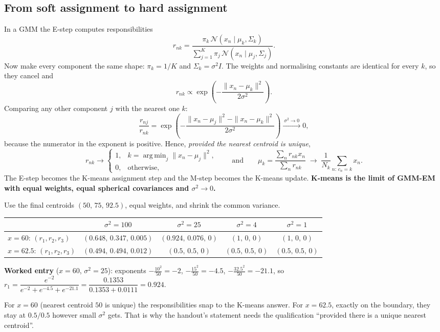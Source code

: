 \documentclass[11pt,a4paper]{article}
\newcommand{\N}{\mathcal{N}}
\DeclareMathOperator*{\argmin}{arg\,min}
\begin{document}
\subsection{From soft assignment to hard assignment}

In a GMM the E-step computes responsibilities
\[
r_{nk}=\frac{\pi_k\,\N(x_n\mid\mu_k,\Sigma_k)}{\sum_{j=1}^K\pi_j\,\N(x_n\mid\mu_j,\Sigma_j)}.
\]
Now make every component the same shape: $\pi_k=1/K$ and $\Sigma_k=\sigma^2I$. The weights and normalising constants are identical for every $k$, so they cancel and
\[
r_{nk}\propto\exp\!\left(-\frac{\|x_n-\mu_k\|^2}{2\sigma^2}\right).
\]
Comparing any other component $j$ with the nearest one $k$:
\[
\frac{r_{nj}}{r_{nk}}=\exp\!\left(-\frac{\|x_n-\mu_j\|^2-\|x_n-\mu_k\|^2}{2\sigma^2}\right)\xrightarrow{\ \sigma^2\to0\ }0,
\]
because the numerator in the exponent is positive. Hence, \emph{provided the nearest centroid is unique},
\[
r_{nk}\to\begin{cases}1,&k=\argmin_j\|x_n-\mu_j\|^2,\\0,&\text{otherwise,}\end{cases}
\qquad\text{and}\qquad
\mu_k=\frac{\sum_nr_{nk}x_n}{\sum_nr_{nk}}\;\to\;\frac{1}{N_k}\sum_{n:\,c_n=k}x_n .
\]
The E-step becomes the K-means assignment step and the M-step becomes the K-means update. \textbf{K-means is the limit of GMM-EM with equal weights, equal spherical covariances and $\sigma^2\to0$.}

\begin{example}
Use the final centroids $(50,\,75,\,92.5)$, equal weights, and shrink the common variance.
\begin{center}
\begin{tabular}{@{}lcccc@{}}
\toprule
& $\sigma^2=100$ & $\sigma^2=25$ & $\sigma^2=4$ & $\sigma^2=1$\\
\midrule
$x=60$: $(r_1,r_2,r_3)$ & $(0.648,\,0.347,\,0.005)$ & $(0.924,\,0.076,\,0)$ & $(1,\,0,\,0)$ & $(1,\,0,\,0)$\\
$x=62.5$: $(r_1,r_2,r_3)$ & $(0.494,\,0.494,\,0.012)$ & $(0.5,\,0.5,\,0)$ & $(0.5,\,0.5,\,0)$ & $(0.5,\,0.5,\,0)$\\
\bottomrule
\end{tabular}
\end{center}
\textbf{Worked entry} ($x=60$, $\sigma^2=25$): exponents $-\frac{10^2}{50}=-2$, $-\frac{15^2}{50}=-4.5$, $-\frac{32.5^2}{50}=-21.1$, so
$r_1=\dfrac{e^{-2}}{e^{-2}+e^{-4.5}+e^{-21.1}}=\dfrac{0.1353}{0.1353+0.0111}=0.924$.

For $x=60$ (nearest centroid $50$ is unique) the responsibilities snap to the K-means answer. For $x=62.5$, exactly on the boundary, they stay at $0.5/0.5$ however small $\sigma^2$ gets. That is why the handout's statement needs the qualification ``provided there is a unique nearest centroid''.
\end{example}
\end{document}
